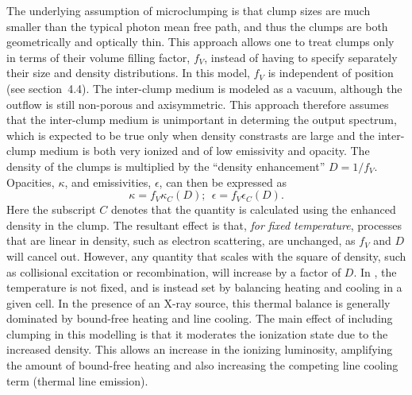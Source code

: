 The underlying assumption of microclumping is that clump sizes 
are much smaller than the 
typical photon mean free path, and thus the clumps are 
both geometrically and optically thin. This approach 
allows one to treat clumps only in terms of their volume filling factor, $f_V$, 
instead of having to specify separately their size and density distributions.
In this model, $f_V$ is independent of position (see section~4.4).
The inter-clump medium is modeled as a vacuum,
although the outflow is still non-porous and axisymmetric.
This approach therefore assumes that the inter-clump medium
is unimportant in determing the output spectrum, which
is expected to be true only when density constrasts are large and
the inter-clump medium is both very ionized and of low emissivity and opacity.
The density of the clumps is multiplied by the ``density enhancement'' 
$D=1/f_V$. Opacities, $\kappa$, and emissivities, $\epsilon$, 
can then be expressed as 
\begin{equation}
\kappa = f_V \kappa_C(D);~~\epsilon = f_V \epsilon_C(D).
\end{equation}
Here the subscript $C$ denotes that the quantity is calculated using the 
enhanced density in the clump. The resultant effect is that, {\em for fixed temperature},
processes that are linear in density, such as electron scattering, are unchanged, 
as $f_V$ and $D$ will cancel out. However, any quantity that scales with the square of density, 
such as collisional excitation or recombination, will increase by a factor of $D$.
In \py, the temperature is not fixed, and is instead set by balancing heating and 
cooling in a given cell. In the presence of an X-ray source, this thermal balance is 
generally dominated by bound-free heating and line cooling. The main effect of including 
clumping in this modelling is that it moderates the ionization state due to the increased 
density. This allows an increase in the ionizing luminosity, amplifying the amount of
bound-free heating and also increasing the competing line cooling term
(thermal line emission).

